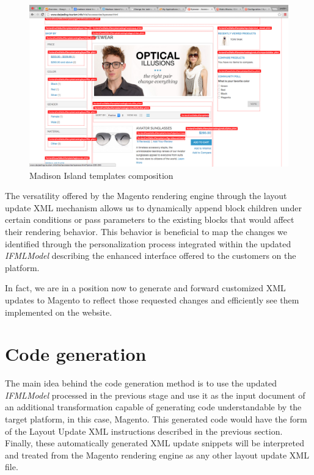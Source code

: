 \vspace{0.5cm}
\begin{figure}[H]
  \centering
    \includegraphics[width=14cm]{images/magento/madison-island-theme.png}
  \caption{Madison Island templates composition}
  \label{fig:magento-madison-island-theme}
\end{figure}
\vspace{0.5cm}

The versatility offered by the Magento rendering engine through the layout update XML mechanism allows us to dynamically append block children under certain conditions or pass parameters to the existing blocks that would affect their rendering behavior. This behavior is beneficial to map the changes we identified through the personalization process integrated within the updated \textit{IFMLModel} describing the enhanced interface offered to the customers on the platform.

In fact, we are in a position now to generate and forward customized XML updates to Magento to reflect those requested changes and efficiently see them implemented on the website.

\newpage
\section{Code generation}

The main idea behind the code generation method is to use the updated \textit{IFMLModel} processed in the previous stage and use it as the input document of an additional transformation capable of generating code understandable by the target platform, in this case, Magento. This generated code would have the form of the Layout Update XML instructions described in the previous section. Finally, these automatically generated XML update snippets will be interpreted and treated from the Magento rendering engine as any other layout update XML file.


